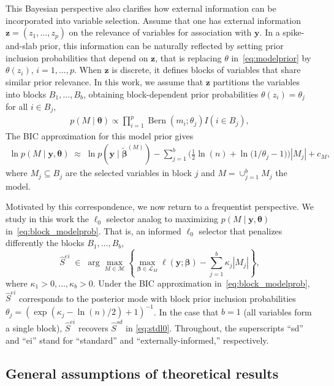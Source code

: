 \documentclass[
  12pt]{article}
\newcommand{\M}{\mathcal{M}}
\newcommand{\by}{\mathbf{y}}
\newcommand{\bz}{\boldsymbol{z}}
\newcommand{\bbeta}{\boldsymbol{\beta}}
\newcommand{\btheta}{\boldsymbol{\theta}}
\begin{document}
This Bayesian perspective also clarifies how external information can be incorporated into variable selection. Assume that one has external information $\bz=(z_1,\ldots,z_p)$ on the relevance of variables for association with $\by$. In a spike-and-slab prior, this information can be naturally reflected by setting prior inclusion probabilities that depend on $\bz$, that is replacing $\theta$ in~\eqref{eq:modelprior} by $\theta(z_i)$, $i=1,\ldots,p$. When $\bz$ is discrete, it defines blocks of variables that share similar prior relevance. In this work, we assume that $\bz$ partitions the variables into blocks $B_1,\ldots,B_b$, 
obtaining block-dependent prior probabilities $\theta(z_i)= \theta_j$ for all $i \in B_j$,
 \begin{eqnarray} \label{eq:block_modelprior}
 p( M \mid \btheta) \propto
         \prod_{i=1}^p \operatorname{Bern}\left(m_i ; \theta_j\right) I(i \in B_j),
\end{eqnarray}
The BIC approximation for this model prior gives
\begin{eqnarray}\label{eq:block_modelprob}
\ln p(M \mid\by, \mathbf{\theta}) \;\approx\; \ln p(\by \mid \tilde{\bbeta}^{(M)}) - \sum_{j=1}^b\Big(\frac{1}{2}\ln(n) +\ln \big(1/\theta_j-1\big)\Big)|M_j| + c_M,
\end{eqnarray}
where $M_j \subseteq B_j$ are
the selected variables in block $j$ and $M=\cup_{j=1}^b M_j$ the model.

Motivated by this correspondence, we now return to a frequentist perspective. We study in this work the $\ell_0$ selector analog to maximizing $p(M \mid \by, \mathbf{\theta})$ in~\eqref{eq:block_modelprob}. That is, an informed $\ell_0$ selector that penalizes differently the blocks $B_1,\ldots,B_b$,
\begin{equation}\label{eq:Mhat}
  \hat S^{ei}\;\in\;\arg\max_{M\in \M} \left\{\max_{\bbeta\in \mathcal{L}_M}\ell(\by; \bbeta)-\sum_{j=1}^b\kappa_j |M_j| \right\},
\end{equation}
where $\kappa_1>0,\ldots,\kappa_b>0$. Under the BIC approximation in~\eqref{eq:block_modelprob}, $\hat S^{ei}$ corresponds to the posterior mode with block prior inclusion probabilities $\theta_j=(\exp(\kappa_j-\ln(n)/2)+1)^{-1}$. In the case that $b=1$ (all variables form a single block), $\hat S^{ei}$ recovers $\hat{S}^{sd}$ in \eqref{eq:stdl0}. Throughout, the superscripts “sd” and “ei” stand for “standard” and “externally-informed,” respectively.

\subsection{General assumptions of theoretical results}\label{ssec:genassumptions}
\end{document}

